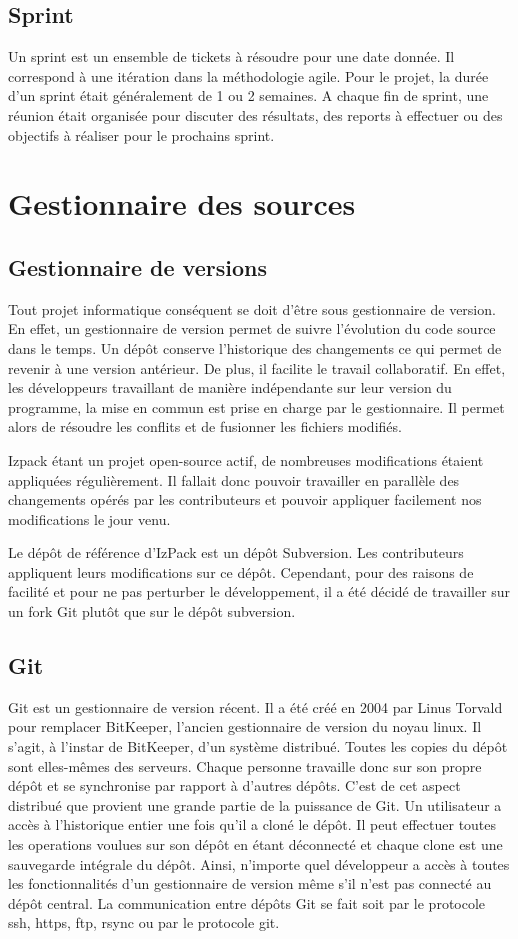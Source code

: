 \subsection{Sprint}
Un sprint est un ensemble de tickets à résoudre pour une date donnée.
Il correspond à une itération dans la méthodologie agile.
Pour le projet, la durée d'un sprint était généralement de 1 ou 2 semaines.
A chaque fin de sprint, une réunion était organisée pour discuter des résultats, des reports à effectuer ou des objectifs à réaliser pour le prochains sprint.
\section{Gestionnaire des sources}
\subsection{Gestionnaire de versions}
Tout projet informatique conséquent se doit d'être sous gestionnaire de version.
En effet, un gestionnaire de version permet de suivre l'évolution du code source dans le temps.
Un dépôt conserve l'historique des changements ce qui permet de revenir à une version antérieur.
De plus, il facilite le travail collaboratif.
En effet, les développeurs travaillant de manière indépendante sur leur version du programme, la mise en commun est prise en charge par le gestionnaire.
Il permet alors de résoudre les conflits et de fusionner les fichiers modifiés.

Izpack étant un projet open-source actif, de nombreuses modifications étaient appliquées régulièrement.
Il fallait donc pouvoir travailler en parallèle des changements opérés par les contributeurs et pouvoir appliquer facilement nos modifications le jour venu.

Le dépôt de référence d'IzPack est un dépôt Subversion.
Les contributeurs appliquent leurs modifications sur ce dépôt.
Cependant, pour des raisons de facilité et pour ne pas perturber le développement, il a été décidé de travailler sur un fork Git plutôt que sur le dépôt subversion.
\subsection{Git}
Git est un gestionnaire de version récent. Il a été créé en 2004 par Linus Torvald pour remplacer BitKeeper, l'ancien gestionnaire de version du noyau linux.
Il s'agit, à l'instar de BitKeeper, d'un système distribué.
Toutes les copies du dépôt sont elles-mêmes des serveurs.
Chaque personne travaille donc sur son propre dépôt et se synchronise par rapport à d'autres dépôts.
C'est de cet aspect distribué que provient une grande partie de la puissance de Git.
Un utilisateur a accès à l'historique entier une fois qu'il a cloné le dépôt.
Il peut effectuer toutes les operations voulues sur son dépôt en étant déconnecté et chaque clone est une sauvegarde intégrale du dépôt.
Ainsi, n'importe quel développeur a accès à toutes les fonctionnalités d'un gestionnaire de version même s'il n'est pas connecté au dépôt central.
La communication entre dépôts Git se fait soit par le protocole ssh, https, ftp, rsync ou par le protocole git.

